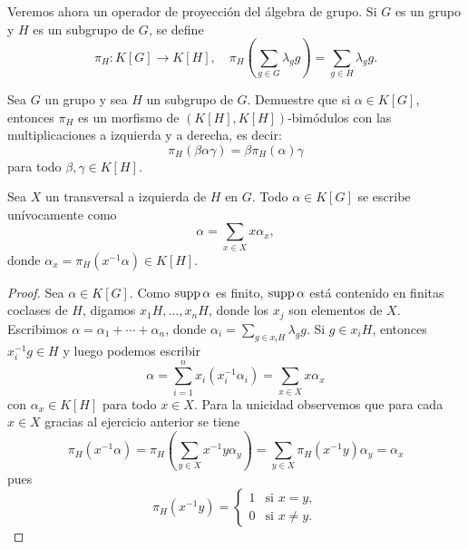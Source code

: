 Veremos ahora un operador de proyección del álgebra de grupo. Si $G$ es un
grupo y $H$ es un subgrupo de $G$, se define
\[
	\pi_H\colon K[G]\to K[H],\quad
	\pi_H\left(\sum_{g\in G}\lambda_gg\right)=\sum_{g\in H}\lambda_gg.
\]

\begin{exercise}
	Sea $G$ un grupo y sea $H$ un subgrupo de $G$. Demuestre que si $\alpha\in
	K[G]$, entonces $\pi_H$ es un morfismo de $(K[H],K[H])$-bimódulos con las
	multiplicaciones a izquierda y a derecha, es decir:
	\[
		\pi_H(\beta\alpha\gamma)=\beta\pi_H(\alpha)\gamma
	\]
	para todo 
	$\beta,\gamma\in K[H]$.
\end{exercise}


\begin{lemma}
	\label{lem:escritura}
	Sea $X$ un transversal a izquierda de $H$ en $G$. Todo $\alpha\in K[G]$ se
	escribe unívocamente como 
	\[
	\alpha=\sum_{x\in X}x\alpha_x,
	\]
	donde $\alpha_x=\pi_H(x^{-1}\alpha)\in K[H]$.
\end{lemma}

\begin{proof}
	Sea $\alpha\in K[G]$. Como $\operatorname{supp}\alpha$ es finito, $\operatorname{supp}\alpha$ está
	contenido en finitas coclases de $H$, digamos $x_1H,\dots,x_nH$, donde los
	$x_j$ son elementos de $X$. Escribimos $\alpha=\alpha_1+\cdots+\alpha_n$,
	donde $\alpha_i=\sum_{g\in x_iH}\lambda_gg$. Si $g\in x_iH$, entonces
	$x_i^{-1}g\in H$ y luego podemos escribir
	\[
		\alpha=\sum_{i=1}^n x_i(x_i^{-1}\alpha_i)=\sum_{x\in X}x\alpha_x
	\]
	con $\alpha_x\in K[H]$ para todo $x\in X$. Para la unicidad observemos que
	para cada $x\in X$ gracias al ejercicio anterior se tiene 
	\[
		\pi_H(x^{-1}\alpha)
		=\pi_H\left(\sum_{y\in X}x^{-1}y\alpha_y\right)
		=\sum_{y\in X}\pi_H(x^{-1}y)\alpha_y=\alpha_x
	\]
	pues 
	\[
		\pi_H(x^{-1}y)=\begin{cases}
		1 & \text{si $x=y$},\\
		0 & \text{si $x\ne y$}.
	\end{cases}
	\]
\end{proof}


